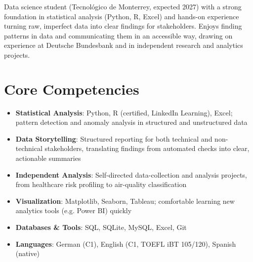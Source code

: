 \documentclass[11pt,a4paper,sans]{moderncv}
\begin{document}
\makecvtitle


\vspace{6pt}
\small{Data science student (Tecnológico de Monterrey, expected 2027) with a strong foundation in statistical analysis (Python, R, Excel) and hands-on experience turning raw, imperfect data into clear findings for stakeholders. Enjoys finding patterns in data and communicating them in an accessible way, drawing on experience at Deutsche Bundesbank and in independent research and analytics projects.}


\section{Core Competencies}
\vspace{1pt}
\begin{itemize}

\item \textbf{Statistical Analysis}: Python, R (certified, LinkedIn Learning), Excel; pattern detection and anomaly analysis in structured and unstructured data

\item \textbf{Data Storytelling}: Structured reporting for both technical and non-technical stakeholders, translating findings from automated checks into clear, actionable summaries

\item \textbf{Independent Analysis}: Self-directed data-collection and analysis projects, from healthcare risk profiling to air-quality classification

\item \textbf{Visualization}: Matplotlib, Seaborn, Tableau; comfortable learning new analytics tools (e.g. Power BI) quickly

\item \textbf{Databases \& Tools}: SQL, SQLite, MySQL, Excel, Git

\item \textbf{Languages}: German (C1), English (C1, TOEFL iBT 105/120), Spanish (native)

\end{itemize}
\end{document}
